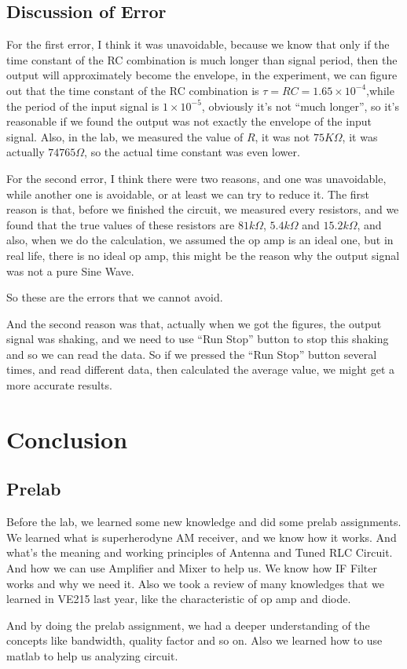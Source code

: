 \documentclass[12pt]{article}
\begin{document}
\subsection{Discussion of Error}
For the first error, I think it was unavoidable, because we know that only if the time constant of the RC combination is much longer than signal period, then the output will approximately become the envelope, in the experiment, we can figure out that the time constant of the RC combination is $\tau=RC=1.65\times 10^{-4}$,while the period of the input signal is $1\times 10^{-5}$, obviously it’s not “much longer”, so it’s reasonable if we found the output was not exactly the envelope of the input signal. Also, in the lab, we measured the value of $R$, it was not $75K\Omega$, it was actually $74765\Omega$, so the actual time constant was even lower.
\par For the second error, I think there were two reasons, and one was unavoidable, while another one is avoidable, or at least we can try to reduce it. The first reason is that, before we finished the circuit, we measured every resistors, and we found that the true values of these resistors are $81k\Omega$, $5.4k\Omega$ and $15.2k\Omega$, and also, when we do the calculation, we assumed the op amp is an ideal one, but in real life, there is no ideal op amp, this might be the reason why the output signal was not a pure Sine Wave.
\par So these are the errors that we cannot avoid.
\par And the second reason was that, actually when we got the figures, the output signal was shaking, and we need to use “Run Stop” button to stop this shaking and so we can read the data. So if we pressed the “Run Stop” button several times, and read different data, then calculated the average value, we might get a more accurate results.
\section{Conclusion}
\subsection{Prelab}
Before the lab, we learned some new knowledge and did some prelab assignments. We learned what is superherodyne AM receiver, and we know how it works. And what’s the meaning and working principles of Antenna and Tuned RLC Circuit. And how we can use Amplifier and Mixer to help us. We know how IF Filter works and why we need it. Also we took a review of many knowledges that we learned in VE215 last year, like the characteristic of op amp and diode.
\par And by doing the prelab assignment, we had a deeper understanding of the concepts like bandwidth, quality factor and so on. Also we learned how to use matlab to help us analyzing circuit.
\end{document}
